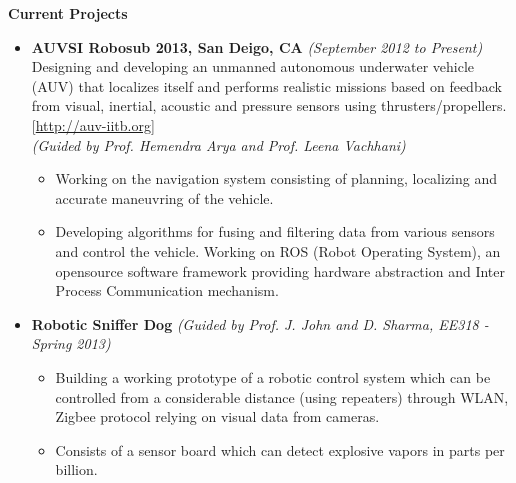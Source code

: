 \documentclass[a4paper,11pt]{article}
\newcommand{\resheading}[1]{{\small \colorbox{mygrey}{\begin{minipage}{0.975\textwidth}{\textbf{#1 \vphantom{p\^{E}}}}\end{minipage}}}}
\begin{document}
\resheading{\textbf{\large{Current Projects}}}
\begin{itemize}
    \item \textbf{AUVSI Robosub 2013, San Deigo, CA} \hfill \emph{(September 2012 to Present) } \\
        Designing and developing an unmanned autonomous underwater vehicle (AUV) that localizes itself and performs realistic missions based on feedback from visual, inertial, acoustic and pressure sensors using thrusters/propellers. \hfill  [\url{http://auv-iitb.org}] \\ 
        \emph{(Guided by Prof. Hemendra Arya and Prof. Leena Vachhani)} \\[-0.6cm]
        \begin{itemize}
            \item Working on the navigation system consisting of planning, localizing and accurate maneuvring of the vehicle.
            \item Developing algorithms for fusing and filtering data from various sensors and control the vehicle. Working on ROS (Robot Operating System), an opensource software framework providing hardware abstraction and Inter Process Communication mechanism.
        \end{itemize}
\item \textbf{Robotic Sniffer Dog} \hfill \emph{(Guided by Prof. J. John and  D. Sharma, EE318 - Spring 2013)}
        \begin{itemize}
            \item Building a working prototype of a robotic control system which can be controlled from a considerable distance (using repeaters) through WLAN, Zigbee protocol relying on visual data from cameras.
            \item Consists of a sensor board which can detect explosive vapors in parts per billion. 
        \end{itemize}
        \begin{comment}
    \item \textbf{Processor design on FPGA}  \hfill \emph{(Guided by Prof. V. Singh, EE739 - Spring 2013)}
        \begin{itemize}
            \item Involves designing a specific processor architecture on FPGA
            \item Literature survey about available processor architectures, proposing a better one and demonstrating using FPGA
        \end{itemize}
    \end{comment}

\end{itemize}
\end{document}
